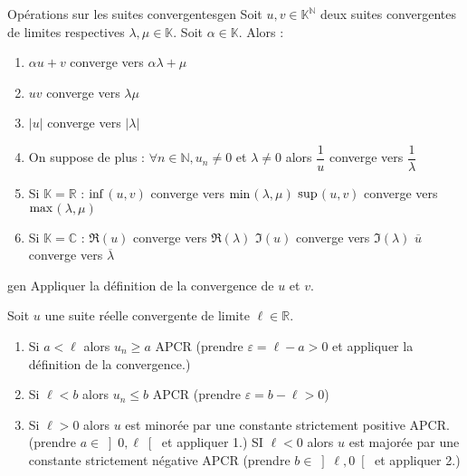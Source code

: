 \documentclass[12pt,a4paper]{report}
\begin{document}
\begin{theoreme}{Opérations sur les suites convergentes}{gen}
Soit $u,v \in \mathbb{K}^\mathbb{N}$ deux suites convergentes de limites respectives $\lambda, \mu \in \mathbb{K}$. Soit $\alpha \in \mathbb{K}$. Alors : 
\begin{enumerate}
\item $\alpha u + v$ converge vers $\alpha \lambda + \mu$
\item $uv$ converge vers $\lambda \mu$
\item $\lvert u \rvert$ converge vers $\lvert \lambda \rvert$
\item On suppose de plus : $\forall n \in \mathbb{N}, u_n \neq 0$ et $\lambda \neq 0$ alors $\dfrac {1}{u}$ converge vers $\dfrac{1}{\lambda}$
\item Si $\mathbb{K}=\mathbb{R}$ :
\newline $\rm{inf}$$(u,v)$ converge vers $\rm{min}$$(\lambda,\mu)$
\newline $\rm{sup}$$(u,v)$ converge vers $\rm{max}$$(\lambda,\mu)$
\item Si $\mathbb{K}=\mathbb{C}$ :
\newline $\Re(u)$ converge vers $\Re(\lambda)$
\newline $\Im(u)$ converge vers $\Im(\lambda)$
\newline $\overline u$ converge vers $\overline \lambda$
\end{enumerate}
\end{theoreme}

\begin{principedemo}{gen}
Appliquer la définition de la convergence de $u$ et $v$.
\end{principedemo}


\begin{remarque}
Soit $u$ une suite réelle convergente de limite $\ell \in \mathbb{R}.$
\begin{enumerate}

\item Si $a < \ell$ alors $u_n \geq a$ APCR (prendre $\varepsilon = \ell - a > 0$ et appliquer la définition de la convergence.)
\item Si $\ell < b$ alors $u_n \leq b$ APCR (prendre $\varepsilon = b - \ell > 0$)
\item Si $\ell > 0$ alors $u$ est minorée par une constante strictement positive APCR. (prendre $a \in \left]0,\ell\right[$ et appliquer 1.)
\newline SI $\ell < 0$ alors $u$ est majorée par une constante strictement négative APCR (prendre $b \in \left]\ell,0\right[$ et appliquer 2.)
\end{enumerate}
\end{remarque}
\end{document}
